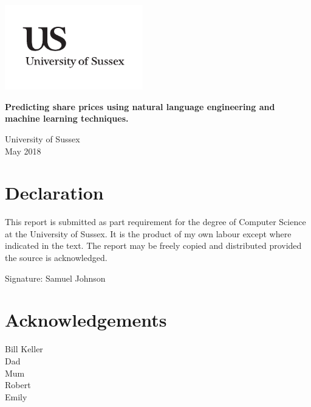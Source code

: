 \documentclass[a4paper,11pt]{report}
\newcommand{\linespacing}{1.5}
\renewcommand{\baselinestretch}{\linespacing}
\begin{document}




\thispagestyle{empty}
\begin{flushright}
\includegraphics[width=6cm]{uslogo}
\end{flushright}
\vskip40mm
\begin{center}
\huge\textbf{Predicting share prices using natural language engineering and machine learning techniques.}
\vskip2mm
\vskip5mm
\normalsize
\end{center}
\vfill
\begin{flushleft}
\large
University of Sussex	\\
May	 2018
\end{flushleft}


\chapter*{Declaration}
This report is submitted as part requirement for the degree of Computer Science at the University of Sussex. It is the product of my own labour except where indicated in the text. The report may be freely copied and distributed provided the source is acknowledged.


\vskip5mm
Signature:
\vskip20mm
Samuel Johnson

\chapter*{Acknowledgements}
\renewcommand{\baselinestretch}{\linespacing}
\small\normalsize
Bill Keller\\
Dad\\
Mum\\
Robert\\
Emily\\
\end{document}
